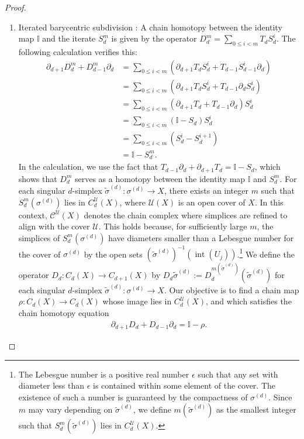 \begin{proof}
\begin{enumerate}
	\item Iterated barycentric subdivision \cite[Proposition 2.21 (4)]{hatcher2005algebraic}: A chain homotopy between the identity map \( \mathbb{I} \) and the iterate \( S^m_d \) is given by the operator $D^m_d = \sum_{0 \leq i < m} T_d S_d^i$. The following calculation verifies this:
	\begin{align}
		\partial_{d+1} D^m_d + D^m_{d-1} \partial_{d} & = \sum_{0 \leq i < m} (\partial_{d+1} T_d S_d^i + T_{d-1} S_{d-1}^i \partial_{d}) \nonumber\\
		&= \sum_{0 \leq i < m} (\partial_{d+1} T_d S_d^i + T_{d-1} \partial_{d} S_{d}^i) \nonumber\\
		& = \sum_{0 \leq i < m} (\partial_{d+1} T_d + T_{d-1} \partial_d) S_{d}^i \nonumber\\
		&= \sum_{0 \leq i < m} (\mathbb{I} - S_{d}) S_{d}^i \nonumber\\
		& = \sum_{0 \leq i < m} (S_{d}^i - S_{d}^{i+1}) \nonumber\\
		&= \mathbb{I} - S^m_{d}.                                                       
	\end{align}
	In the calculation, we use the fact that \( T_{d-1}\partial_{d} + \partial_{d+1} T_{d} = \mathbb{I} - S_{d} \), which shows that \( D^m_d \) serves as a homotopy between the identity map \( \mathbb{I} \) and \( S^m_d \). For each singular \( d \)-simplex \( \tilde{\sigma}^{(d)} : \sigma^{(d)} \to X \), there exists an integer \( m \) such that \( S^m_d(\sigma^{(d)}) \) lies in \( C_d^{\mathcal{U}}(X) \), where \( \mathcal{U}(X) \) is an open cover of \( X \). In this context, \( \mathcal{C}^{\mathcal{U}}(X) \) denotes the chain complex where simplices are refined to align with the cover \( \mathcal{U} \). This holds because, for sufficiently large \( m \), the simplices of \( S^m_d(\sigma^{(d)}) \) have diameters smaller than a Lebesgue number for the cover of \( \sigma^{(d)} \) by the open sets \( (\tilde{\sigma}^{(d)})^{-1}(\operatorname{int}(U_j)) \).\footnote{The Lebesgue number is a positive real number \( \epsilon \) such that any set with diameter less than \( \epsilon \) is contained within some element of the cover. The existence of such a number is guaranteed by the compactness of \( \sigma^{(d)} \). Since \( m \) may vary depending on \( \tilde{\sigma}^{(d)} \), we define \( m(\tilde{\sigma}^{(d)}) \) as the smallest integer such that \( S_d^m(\tilde{\sigma}^{(d)}) \) lies in \( C_d^{\mathcal{U}}(X) \).} We define the operator \( D_d : C_d(X) \to C_{d+1}(X) \) by \( D_d\tilde{\sigma}^{(d)} := D_d^{m(\tilde{\sigma}^{(d)})}(\tilde{\sigma}^{(d)}) \) for each singular \( d \)-simplex \( \tilde{\sigma}^{(d)} : \sigma^{(d)} \to X \). Our objective is to find a chain map \( \rho : C_d(X) \to C_d(X) \) whose image lies in \( C_d^{\mathcal{U}}(X) \), and which satisfies the chain homotopy equation
	\begin{align}
		\partial_{d+1} D_{d} + D_{d-1} \partial_{d}= \mathbb{I} - \rho. 
	\end{align}
		

\end{enumerate}
\end{proof}
